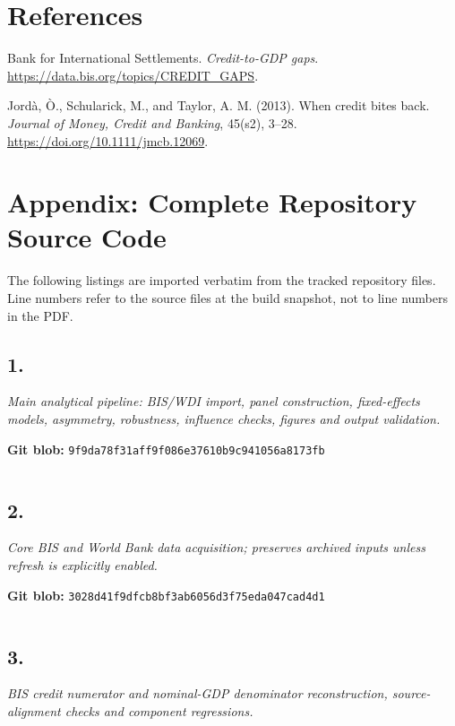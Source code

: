 \documentclass[10pt]{article}
\begin{document}
\section*{References}
Bank for International Settlements. \textit{Credit-to-GDP gaps}. \url{https://data.bis.org/topics/CREDIT_GAPS}.\par
Jordà, Ò., Schularick, M., and Taylor, A. M. (2013). When credit bites back. \textit{Journal of Money, Credit and Banking}, 45(s2), 3--28. \url{https://doi.org/10.1111/jmcb.12069}.

\clearpage
\section*{Appendix: Complete Repository Source Code}
The following listings are imported verbatim from the tracked repository files. Line numbers refer to the source files at the build snapshot, not to line numbers in the PDF.

\subsection*{1. \texttt{}}
\textit{Main analytical pipeline: BIS/WDI import, panel construction, fixed-effects models, asymmetry, robustness, influence checks, figures and output validation.}

\noindent\textbf{Git blob:} \texttt{9f9da78f31aff9f086e37610b9c941056a8173fb}

\inputminted[linenos,fontsize=\scriptsize,breaklines,breakanywhere]{stata}{replication/run_analysis.do}


\clearpage
\subsection*{2. \texttt{}}
\textit{Core BIS and World Bank data acquisition; preserves archived inputs unless refresh is explicitly enabled.}

\noindent\textbf{Git blob:} \texttt{3028d41f9dfcb8bf3ab6056d3f75eda047cad4d1}

\inputminted[linenos,fontsize=\scriptsize,breaklines,breakanywhere]{stata}{replication/download_data.do}


\clearpage
\subsection*{3. \texttt{}}
\textit{BIS credit numerator and nominal-GDP denominator reconstruction, source-alignment checks and component regressions.}
\end{document}
